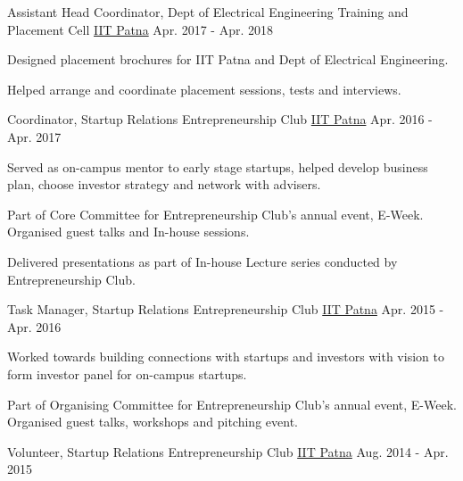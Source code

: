 
\begin{cvpositions}

\cvrole
	{Assistant Head Coordinator, Dept of Electrical Engineering} %
	{Training and Placement Cell} %
	{\href{https://www.iitp.ac.in}{IIT Patna}} %
	{Apr. 2017 - Apr. 2018} %
	{\begin{cvitems} %
		\item {Designed placement brochures for IIT Patna and Dept of Electrical Engineering.}
		\item {Helped arrange and coordinate placement sessions, tests and interviews.}
	\end{cvitems}}

\cvrole
	{Coordinator, Startup Relations} %
	{Entrepreneurship Club} %
	{\href{https://www.iitp.ac.in}{IIT Patna}} %
	{Apr. 2016 - Apr. 2017} %
	{\begin{cvitems} %
		\item {Served as on-campus mentor to early stage startups, helped develop business plan, choose investor strategy and network with advisers.}
		\item {Part of Core Committee for Entrepreneurship Club's annual event, E-Week. Organised guest talks and In-house sessions.}
		\item {Delivered presentations as part of In-house Lecture series conducted by Entrepreneurship Club.}
	\end{cvitems}}

\cvrole
	{Task Manager, Startup Relations} %
	{Entrepreneurship Club} %
	{\href{https://www.iitp.ac.in}{IIT Patna}} %
	{Apr. 2015 - Apr. 2016} %
	{\begin{cvitems} %
		\item {Worked towards building connections with startups and investors with vision to form investor panel for on-campus startups.}
		\item {Part of Organising Committee for Entrepreneurship Club's annual event, E-Week. Organised guest talks, workshops and pitching event.}
	\end{cvitems}}

\cvrole
	{Volunteer, Startup Relations} %
	{Entrepreneurship Club} %
	{\href{https://www.iitp.ac.in}{IIT Patna}} %
	{Aug. 2014 - Apr. 2015} %
	{}

\end{cvpositions}
